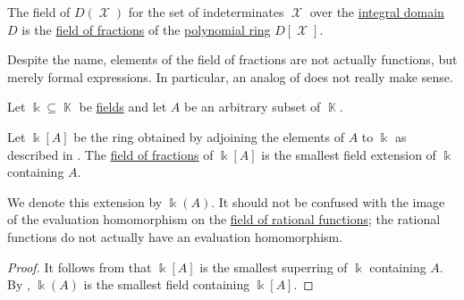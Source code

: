 \begin{definition}\label{def:rational_function_field}
  The field of  \( D(\mscrX) \) for the set of indeterminates \( \mscrX \) over the \hyperref[def:integral_domain]{integral domain} \( D \) is the \hyperref[thm:field_of_fractions]{field of fractions} of the \hyperref[def:polynomial_algebra]{polynomial ring} \( D[\mscrX] \).

  Despite the name, elements of the field of fractions are not actually functions, but merely formal expressions. In particular, an analog of  does not really make sense.
\end{definition}

\begin{proposition}\label{thm:adjoining_elements_to_field}
  Let \( \Bbbk \subseteq \BbbK \) be \hyperref[def:field]{fields} and let \( A \) be an arbitrary subset of \( \BbbK \).

  Let \( \Bbbk[A] \) be the ring obtained by adjoining the elements of \( A \) to \( \Bbbk \) as described in . The \hyperref[thm:field_of_fractions]{field of fractions} of \( \Bbbk[A] \) is the smallest field extension of \( \Bbbk \) containing \( A \).

  We denote this extension by \( \Bbbk(A) \). It should not be confused with the image of the evaluation homomorphism on the \hyperref[def:rational_function_field]{field of rational functions}; the rational functions do not actually have an evaluation homomorphism.
\end{proposition}
\begin{proof}
  It follows from  that \( \Bbbk[A] \) is the smallest superring of \( \Bbbk \) containing \( A \). By , \( \Bbbk(A) \) is the smallest field containing \( \Bbbk[A] \).
\end{proof}
